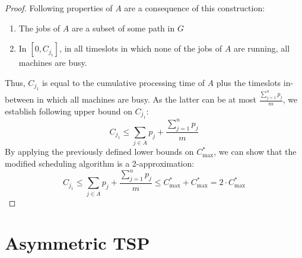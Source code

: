 \documentclass{article}
\begin{document}
\begin{proof}
    Following properties of $A$ are a consequence of this construction:
    \begin{enumerate}
        \item The jobs of $A$ are a subset of some path in $G$
        \item In $[0, C_{j_1}]$, in all timeslots in which none of the jobs of $A$ are running, all machines are busy.
    \end{enumerate}
    Thus, $C_{j_1}$ is equal to the cumulative processing time of $A$ plus the timeslots in-between in which all machines are busy. As the latter can be at most $\frac{\sum^n_{j=1}p_j}{m}$, we establish following upper bound on $C_{j_1}$:
    \[
        C_{j_1} \le \sum_{j \in A} p_j + \frac{\sum^n_{j=1}p_j}{m}
    \]
    By applying the previously defined lower bounds on $C^*_{\max}$, we can show that the modified scheduling algorithm is a 2-approximation:
    \[
        C_{j_1} \le \sum_{j \in A} p_j + \frac{\sum^n_{j=1}p_j}{m} \le C_{\max}^* + C_{\max}^* = 2 \cdot C_{\max}^*
    \]
\end{proof}




\section{Asymmetric TSP}

\end{document}
